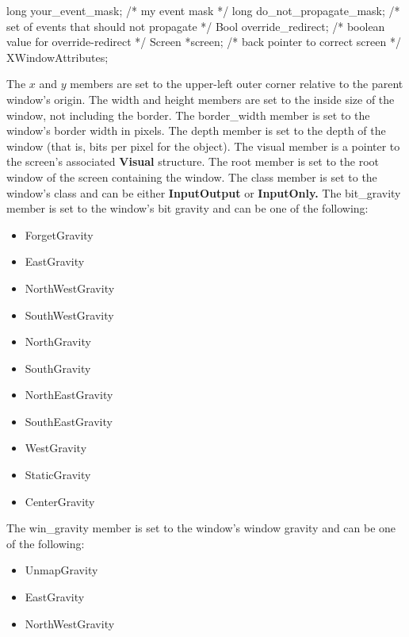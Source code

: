 \documentclass{report}
\begin{document}
\begin{itemize}
\begin{cppcode}
{                    long your_event_mask;               /* my event mask */
                    long do_not_propagate_mask;         /* set of events that should not propagate */
                    Bool override_redirect;             /* boolean value for override-redirect */
                    Screen *screen;                     /* back pointer to correct screen */
                } XWindowAttributes;
            \end{cppcode}
            \bigbreak \noindent 
            The $x$ and $y$ members are set to the upper-left outer corner relative to the parent window’s origin. The width and height members are set to the inside size of the window, not including the border. The border\_width member is set to the window’s border width in pixels. The depth member is set to the depth of the window (that is, bits per pixel for the object). The visual member is a pointer to the screen’s associated \textbf{Visual} structure. The root member is set to the root window of the screen containing the window. The class member is set to the window’s class and can be either \textbf{InputOutput} or \textbf{InputOnly.}
            \bigbreak \noindent 
            The bit\_gravity member is set to the window’s bit gravity and can be one of the following:
            \begin{itemize}
                \item ForgetGravity 
                \item EastGravity
                \item NorthWestGravity 
                \item SouthWestGravity
                \item NorthGravity 
                \item SouthGravity
                \item NorthEastGravity 
                \item SouthEastGravity
                \item WestGravity 
                \item StaticGravity
                \item CenterGravity
            \end{itemize}
            The win\_gravity member is set to the window’s window gravity and can be one of the following:
            \begin{itemize}
                \item UnmapGravity 
                \item EastGravity
                \item NorthWestGravity 

\end{itemize}
\end{itemize}
\end{document}
